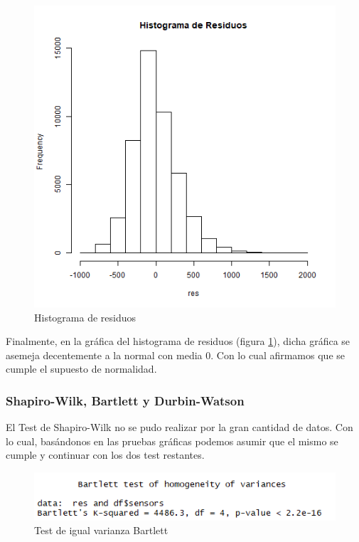 \documentclass[a4paper,10pt,twocolumn]{article}
\begin{document}
 \begin{figure}[h!]
 	\centering
 	\includegraphics[width=\linewidth]{Images/anova_hist.png}
 	\caption{Histograma de residuos}
 	\label{fig:anova_hist}
 \end{figure}
 
 Finalmente, en la gr\'afica del histograma de residuos (figura \ref{fig:anova_hist}), dicha gr\'afica se asemeja decentemente a la normal con media $0$. Con lo cual afirmamos que se cumple el
 supuesto de normalidad.
 

 
 \subsubsection{Shapiro-Wilk, Bartlett y Durbin-Watson}
 
 El Test de Shapiro-Wilk no se pudo realizar por la gran cantidad de datos. Con lo cual, bas\'andonos
 en las pruebas gr\'aficas podemos asumir que el mismo se cumple y continuar con los dos test restantes.
 
 \begin{figure}[h!]
 	\centering
 	\includegraphics[width=\linewidth]{Images/anova_bartlett.png}
 	\caption{Test de igual varianza Bartlett}
 	\label{fig:anova_bartlett}
 \end{figure}
 
\end{document}
